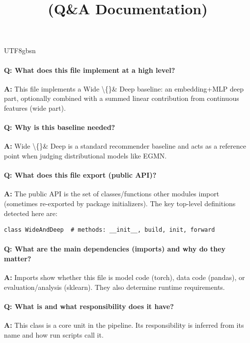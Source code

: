 \documentclass[11pt]{article}
\title{\texttt{\detokenize{model/wd.py}} (Q\&A Documentation)}
\author{}
\date{}
\begin{document}
\begin{CJK*}{UTF8}{gbsn}
\maketitle

\paragraph{Q: What does this file implement at a high level?}
\textbf{A:} This file implements a Wide \textbackslash\{\}\& Deep baseline: an embedding+MLP deep part, optionally combined with a summed linear contribution from continuous features (wide part).

\paragraph{Q: Why is this baseline needed?}
\textbf{A:} Wide \textbackslash\{\}\& Deep is a standard recommender baseline and acts as a reference point when judging distributional models like EGMN.

\paragraph{Q: What does this file export (public API)?}
\textbf{A:} The public API is the set of classes/functions other modules import (sometimes re-exported by package initializers). The key top-level definitions detected here are:

\begin{Verbatim}[fontsize=\small]
class WideAndDeep  # methods: __init__, build, init, forward
\end{Verbatim}

\paragraph{Q: What are the main dependencies (imports) and why do they matter?}
\textbf{A:} Imports show whether this file is model code (torch), data code (pandas), or evaluation/analysis (sklearn). They also determine runtime requirements.

\vspace{1mm}


\paragraph{Q: What is \texttt{} and what responsibility does it have?}
\textbf{A:} This class is a core unit in the pipeline. Its responsibility is inferred from its name and how run scripts call it.


\end{CJK*}
\end{document}
